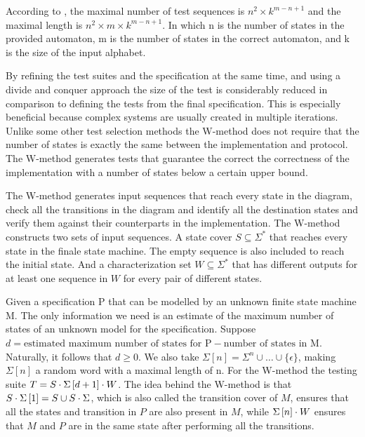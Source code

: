 \documentclass[multi,crop=false,class=article]{standalone}
\begin{document}
According to \cite{vasilevskii73}, the maximal number of test sequences is 
$n^{2} \times k^{m-n+1}$ and the maximal length is 
$n^{2} \times m \times k^{m-n+1}$.
In which n is the number of states in the provided automaton, m is the number
of states in the correct automaton, and k is the size of the input alphabet.

By refining the test suites and the specification at the same time, and
using a divide and conquer approach the size of the test is
considerably reduced in comparison to defining the tests from
the final specification\cite{Ipate07}.
This is especially beneficial because complex systems are usually
created in multiple iterations.
Unlike some other test selection methods the W-method does not require
that the number of states is exactly the same between
the implementation and protocol.
The W-method generates tests that guarantee the correct the
correctness of the implementation with a number of states below a
certain upper bound.

The W-method generates input sequences that reach every state in the
diagram, check all the transitions in the diagram and identify all the
destination states and verify them against their counterparts in
the implementation\cite{Ipate07}.
The W-method constructs two sets of input sequences.
A state cover $S \subseteq \Sigma^{*}$ that reaches every state in the
finale state machine.
The empty sequence is also included to reach the initial state.
And a characterization set $W \subseteq \Sigma^{*}$ that has different
outputs for at least one sequence in $W$ for every pair of different states.

Given a specification P that can be modelled by an unknown finite
state machine M.
The only information we need is an estimate of the maximum number of
states of an unknown model for the specification.
Suppose $d = \text{estimated maximum number of states for P}
- \text{number of states in M}$.
Naturally, it follows that $d \geq 0$.
We also take $\Sigma \left[ n \right] = \Sigma^{n} \cup \dots \cup \lbrace \epsilon \rbrace$,
making $\Sigma\left[ n \right]$ a random word with a maximal length of n.
For the W-method the testing suite $T = S \cdot \Sigma\left[ d + 1 \right]  \cdot W$.
The idea behind the W-method is that $S \cdot \Sigma\left[ 1 \right]  = S \cup S
\cdot \Sigma$, which is also called the transition cover of $M$, ensures that all the
states and transition in $P$ are also present in $M$, while
$\Sigma\left[ n \right] \cdot W$ ensures that $M$ and $P$ are in the same state after
performing all the transitions.
\end{document}
